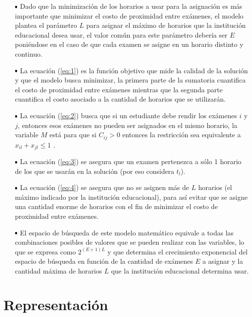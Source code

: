 \documentclass[letter, 10pt]{article}
\newcommand*\sq{\mathbin{\vcenter{\hbox{\rule{.7ex}{.7ex}}}}}
\begin{document}
\begin{itemize}
	\item[$\sq$] Dado que la minimización de los horarios a usar para la asignación es más importante que minimizar el costo de proximidad entre exámenes, el modelo plantea el parámetro $L$ para asignar el máximo de horarios que la institución educacional desea usar, el valor común para este parámetro debería ser $E$ poniéndose en el caso de que cada examen se asigne en un horario distinto y continuo.

	\item[$\sq$] La ecuación (\ref{eq:1}) es la función objetivo que mide la calidad de la solución y que el modelo busca minimizar, la primera parte de la sumatoria cuantifica el costo de proximidad entre exámenes mientras que la segunda parte cuantifica el costo asociado a la cantidad de horarios que se utilizarán.
	
	\item[$\sq$] La ecuación (\ref{eq:2}) busca que si un estudiante debe rendir los exámenes $i$ y $j$, entonces esos exámenes no pueden ser asignados en el mismo horario, la variable $M$ está para que si $C_{ij} > 0$ entonces la restricción sea equivalente a $x_{il} + x_{jl} \leq 1$ \cite{LAPORTE1984351}.

	\item[$\sq$] La ecuación (\ref{eq:3}) se asegura que un examen pertenezca a sólo 1 horario de los que se usarán en la solución (por eso considera $t_{l}$).

	\item[$\sq$] La ecuación (\ref{eq:4}) se asegura que no se asignen más de $L$ horarios (el máximo indicado por la institución educacional), para así evitar que se asigne una cantidad enorme de horarios con el fin de minimizar el costo de proximidad entre exámenes.

	\item[$\sq$] El espacio de búsqueda de este modelo matemático equivale a todas las combinaciones posibles de valores que se pueden realizar con las variables, lo que se expresa como $2^{(E + 1)L}$ y que determina el crecimiento exponencial del espacio de búsqueda en función de la cantidad de exámenes $E$ a asignar y la cantidad máxima de horarios $L$ que la institución educacional determina usar.
\end{itemize}

\section{Representación}
\end{document}
